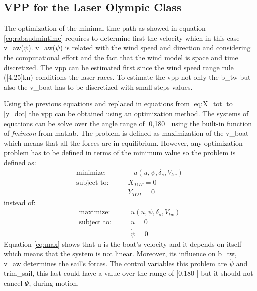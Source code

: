 \subsection{ VPP for the Laser Olympic Class}
The optimization of the minimal time path as showed in equation \ref{eq:rabaudmintime} requires to determine first the velocity which in this case \acrshort{v_aw}($\psi$). \acrshort{v_aw}($\psi$) is related with the wind speed and direction and considering the computational effort and the fact that the wind model is space and time discretized. The \acrshort{vpp} can be estimated first since the wind speed range rule ([4,25]kn) conditions the laser races. To estimate the \acrshort{vpp} not only the \acrshort{b_tw} but also the \acrshort{v_boat} has to be discretized with small steps values. \par \noindent 
Using the previous equations and replaced in equations from \ref{eq:X_tot} to \ref{y_dot} the \acrshort{vpp} can be obtained using an optimization method. The systems of equations can be solve over the angle range of [0,180 \degree] using the built-in function of \textit{fmincon} from \acrshort{matlab}\cite{rein2012tra}. The problem is defined as maximization of the \acrshort{v_boat} which means that all the forces are in equilibrium. However, any  optimization problem has to be defined in terms of the minimum value so the problem is defined as:
\begin{align}
    \text{minimize:}\qquad & -u(u,\psi,\delta_{s},V_{tw})  \label{eq:max}\\
\text{subject to:} \qquad & X_{TOT}=0 \\
 \qquad & Y_{TOT}=0
\end{align} \label{eq:opt_vpp2}
instead of: 
\begin{align}
    \text{maximize:}\qquad & u(u,\psi,\delta_{s},V_{tw})  \label{eq:max2}\\
\text{subject to:} \qquad & \Dot{u}=0 \\
& \Dot{\psi}=0
\end{align} \label{eq:opt_vpp}
Equation \ref{eq:max} shows that \acrshort{u} is the boat's velocity and it depends on itself which means that the system is not linear. Moreover, its influence on \acrshort{b_tw}, \acrshort{v_aw} determines the sail's forces. The control variables this problem are $\Dot{\psi}$ and \acrshort{trim_sail}, this last could have a value over the range of [0,180 \degree] but it should not cancel $\Psi$, during motion.
